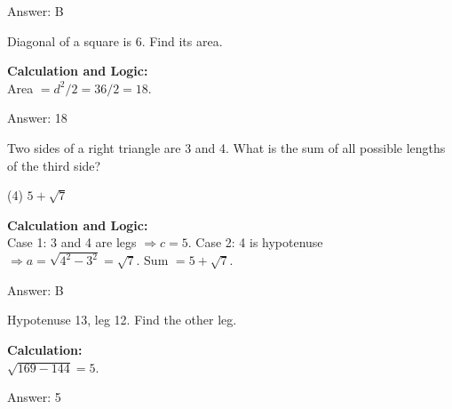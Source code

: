 \documentclass[11pt,paper=a4,answers]{exam}
\begin{document}
\begin{questions}
\begin{solution}
\vspace{30pt}

Answer: \colorbox{yellow!100}{B}
\end{solution}

\vspace{60pt}

\question
Diagonal of a square is 6. Find its area.

\begin{solution}
\textbf{Calculation and Logic:} \\
Area $= d^2 / 2 = 36 / 2 = 18$.

\vspace{30pt}

Answer: \colorbox{yellow!100}{18}
\end{solution}

\vspace{60pt}

\question
Two sides of a right triangle are 3 and 4. What is the sum of all possible lengths of the third side?
\begin{tasks}(4)
    \task $5 + \sqrt{7}$
\end{tasks}

\begin{solution}
\textbf{Calculation and Logic:} \\
Case 1: 3 and 4 are legs $\Rightarrow c = 5$. Case 2: 4 is hypotenuse $\Rightarrow a = \sqrt{4^2 - 3^2} = \sqrt{7}$. Sum $= 5 + \sqrt{7}$.

\vspace{30pt}

Answer: \colorbox{yellow!100}{B}
\end{solution}

\vspace{60pt}

\question
Hypotenuse 13, leg 12. Find the other leg.

\begin{solution}
\textbf{Calculation:} \\
$\sqrt{169 - 144} = 5$.

\vspace{30pt}

Answer: \colorbox{yellow!100}{5}
\end{solution}


\end{questions}
\end{document}
